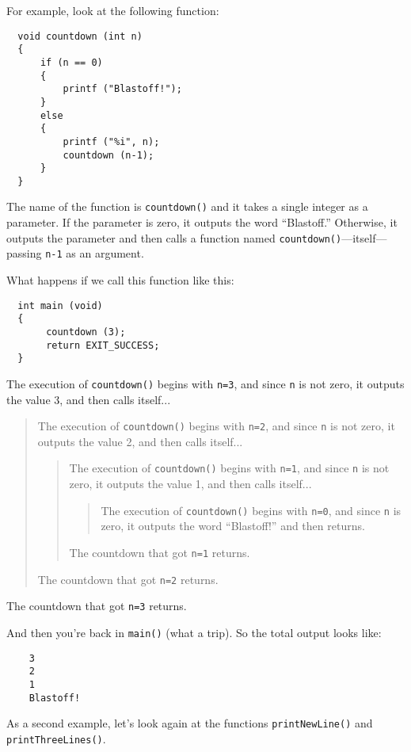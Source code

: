 For example, look at the following function:

\begin{verbatim}
  void countdown (int n) 
  {
      if (n == 0) 
      {
          printf ("Blastoff!");
      }
      else
      {
          printf ("%i", n);
          countdown (n-1);
      }
  }
\end{verbatim}
%
The name of the function is {\tt countdown()} and it takes a single
integer as a parameter.  If the parameter is zero, it outputs
the word ``Blastoff.''  Otherwise, it outputs the parameter and
then calls a function named {\tt countdown()}---itself---passing
{\tt n-1} as an argument.

What happens if we call this function like this:

\begin{verbatim}
  int main (void)
  {
       countdown (3);
       return EXIT_SUCCESS;
  }
\end{verbatim}
%
The execution of {\tt countdown()} begins with {\tt n=3}, and
since {\tt n} is not zero, it outputs the value 3, and then
calls itself...

\begin{quote}
The execution of {\tt countdown()} begins with {\tt n=2}, and
since {\tt n} is not zero, it outputs the value 2, and then
calls itself...

\begin{quote}
The execution of {\tt countdown()} begins with {\tt n=1}, and
since {\tt n} is not zero, it outputs the value 1, and then
calls itself...

\begin{quote}
The execution of {\tt countdown()} begins with {\tt n=0}, and
since {\tt n} is zero, it outputs the word ``Blastoff!''
and then returns.
\end{quote}

The countdown that got {\tt n=1} returns.

\end{quote}

The countdown that got {\tt n=2} returns.

\end{quote}

The countdown that got {\tt n=3} returns.

\noindent And then you're back in {\tt main()} (what a trip).  So the
total output looks like:

\begin{verbatim}
    3
    2
    1
    Blastoff!
\end{verbatim}
%
As a second example, let's look again at the functions
{\tt printNewLine()} and {\tt printThreeLines()}.

